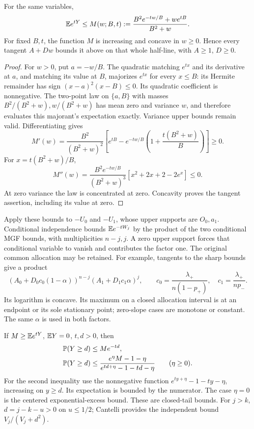 \begin{lemma}
\label{ms:finite:countcore:sharpmgf}
For the same variables,
\[
 \mathbb E e^{tY}\le M(w;B,t):=
 \frac{B^2e^{-tw/B}+we^{tB}}{B^2+w}.
\]
For fixed \(B,t\), the function \(M\) is increasing and concave in
\(w\ge0\). Hence every tangent \(A+D w\) bounds it above on that
whole half-line, with \(A\ge1\), \(D\ge0\).
\end{lemma}
\begin{proof}
For \(w>0\), put \(a=-w/B\). The quadratic matching \(e^{tx}\)
and its derivative at \(a\), and matching its value at \(B\),
majorizes \(e^{tx}\) for every \(x\le B\): its Hermite remainder
has sign \((x-a)^2(x-B)\le0\). Its quadratic coefficient is
nonnegative. The two-point law on \(\{a,B\}\) with masses
\(B^2/(B^2+w),w/(B^2+w)\) has mean zero and variance \(w\),
and therefore evaluates this majorant's expectation exactly. Variance
upper bounds remain valid. Differentiating gives
\[
 M'(w)=\frac{B^2}{(B^2+w)^2}
 \left[e^{tB}-e^{-tw/B}\left(1+\frac{t(B^2+w)}B\right)\right]\ge0.
\]
For \(x=t(B^2+w)/B\),
\[
 M''(w)=\frac{B^2e^{-tw/B}}{(B^2+w)^3}
        [x^2+2x+2-2e^x]\le0.
\]
At zero variance the law is concentrated at zero. Concavity proves the
tangent assertion, including its value at zero.
\end{proof}

Apply these bounds to \(-U_0\) and \(-U_1\), whose upper supports
are \(O_0,a_1\). Conditional independence bounds
\(\mathbb E e^{-tW_j}\) by the product of the two conditional MGF bounds,
with multiplicities \(n-j,j\). A zero upper support forces that
conditional variable to vanish and contributes the factor one.
The original common allocation may be retained. For example, tangents
to the sharp bounds give a product
\[
 (A_0+D_0c_0(1-\alpha))^{n-j}
 (A_1+D_1c_1\alpha)^j,
 \qquad c_0=\frac{\lambda_+}{n(1-p_+)},\quad
 c_1=\frac{\lambda_+}{np_-}.
\]
Its logarithm is concave. Its maximum on a closed allocation interval
is at an endpoint or its sole stationary point; zero-slope cases are
monotone or constant. The same \(\alpha\) is used in both factors.

If \(M\ge\mathbb E e^{tY}\), \(\mathbb E Y=0\), \(t,d>0\), then
\begin{align}
 \mathbb P(Y\ge d)&\le Me^{-td},\notag\\
 \mathbb P(Y\ge d)&\le
 \frac{e^\eta M-1-\eta}{e^{td+\eta}-1-td-\eta}
 \qquad(\eta\ge0).
 \label{ms:finite:countcore:shiftedexcess}
\end{align}
For the second inequality use the nonnegative function
\(e^{ty+\eta}-1-ty-\eta\), increasing on \(y\ge d\).
Its expectation is bounded by the numerator. The case \(\eta=0\)
is the centered exponential-excess bound. These are closed-tail bounds.
For \(j>k\), \(d=j-k-u>0\) on \(u\le1/2\); Cantelli provides
the independent bound \(V_j/(V_j+d^2)\).

